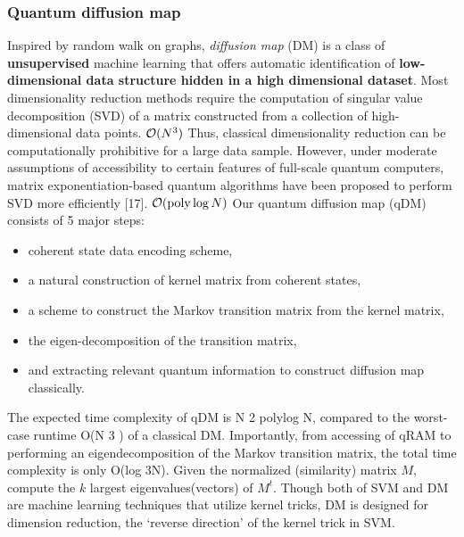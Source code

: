 \subsubsection{Quantum diffusion map}
Inspired by random walk on graphs, \emph{diffusion map} (DM) is a class of \textbf{unsupervised} machine learning that offers automatic identification of \textbf{low-dimensional data structure hidden in a high dimensional dataset}.
Most dimensionality reduction methods require the computation of singular value decomposition (SVD) of a matrix constructed from a collection of high-dimensional data points. $\mathcal{O}(N^3)$
Thus, classical dimensionality reduction can be computationally prohibitive for a large data sample. However, under moderate assumptions of accessibility to certain features of full-scale quantum computers, matrix exponentiation-based quantum algorithms have been proposed to perform SVD more eﬃciently [17]. $\mathcal{O}(\operatorname{\textup{poly}}\log N)$
Our quantum diffusion map (qDM) consists of 5 major steps: 
\begin{itemize}
	\item 
	coherent state data encoding scheme, 
	\item 
	a natural construction of kernel matrix from coherent states, 
	\item 
	a scheme to construct the Markov transition matrix from the kernel matrix, 
	\item 
	the eigen-decomposition of the transition matrix, 
	\item 
	and extracting relevant quantum information to construct diffusion map classically. 
\end{itemize}
The expected time complexity of qDM is N 2 polylog N, compared to the worst-case runtime O(N 3 ) of a classical DM. Importantly, from accessing of qRAM to performing an eigendecomposition of the Markov transition matrix, the total time complexity is only O(log 3N).
Given the normalized (similarity) matrix $M$, 
compute the $k$ largest eigenvalues(vectors) of $M^t$.
Though both of SVM and DM are machine learning techniques that utilize kernel tricks, DM is designed for dimension reduction, the `reverse direction' of the kernel trick in SVM.
